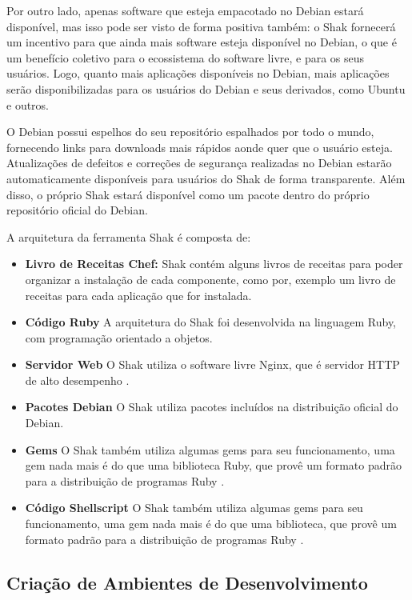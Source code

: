 Por outro lado, apenas software que esteja empacotado no Debian estará
disponível, mas isso pode ser visto de forma positiva também: o Shak
fornecerá um incentivo para que ainda mais software esteja disponível no
Debian, o que é um benefício coletivo para o ecossistema do software livre, e
para os seus usuários. Logo, quanto mais aplicações disponíveis no Debian,
mais aplicações serão disponibilizadas para os usuários do Debian e seus derivados,
como Ubuntu e outros.

O Debian possui espelhos do seu repositório espalhados por todo o mundo,
fornecendo links para downloads mais rápidos aonde quer que o usuário esteja.
Atualizações de defeitos e correções de segurança realizadas no Debian estarão
automaticamente disponíveis para usuários do Shak de forma transparente. Além disso,
o próprio Shak estará disponível como um pacote dentro do próprio repositório oficial do Debian.

A arquitetura da ferramenta Shak é composta de:

\begin{itemize}
  \item  \textbf{Livro de Receitas Chef:} Shak contém alguns livros de receitas
  para poder organizar a instalação de cada componente, como por, exemplo um livro
  de receitas para cada aplicação que for instalada.
  \item  \textbf{Código Ruby} A arquitetura do Shak foi desenvolvida na linguagem
  Ruby, com programação orientado a objetos.
  \item  \textbf{Servidor Web} O Shak utiliza o software livre Nginx, que é
  servidor HTTP de alto desempenho \cite{nginx}.
  \item  \textbf{Pacotes Debian} O Shak utiliza pacotes incluídos na distribuição
  oficial do Debian.
  \item  \textbf{Gems} O Shak também utiliza algumas gems para seu funcionamento,
  uma gem nada mais é do que uma biblioteca Ruby, que provê um formato padrão para
  a distribuição de programas Ruby \cite{gem}.
  \item  \textbf{Código Shellscript} O Shak também utiliza algumas gems para seu funcionamento,
  uma gem nada mais é do que uma biblioteca, que provê um formato padrão para
  a distribuição de programas Ruby \cite{gem}.
\end{itemize}

\subsection{Criação de Ambientes de Desenvolvimento}

